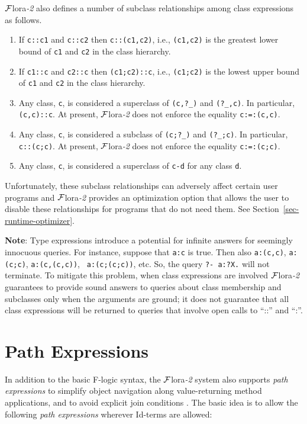 \documentclass[11pt]{article}
\newcommand{\FLORA}{{\mbox{\sc ${\cal F}${lora}\rm\emph{-2}}}\xspace}
\newcommand{\fl}{\mbox{F-logic}\xspace}
\begin{document}
\FLORA also defines a number of subclass relationships among class
expressions as follows.
\begin{enumerate}
\item If {\tt c::c1} and {\tt c::c2} then {\tt c::(c1,c2)}, i.e.,
  {\tt (c1,c2)} is the greatest lower bound of {\tt c1} and {\tt c2} in the
  class hierarchy.
\item If {\tt c1::c} and {\tt c2::c} then {\tt (c1;c2)::c}, i.e.,
  {\tt (c1;c2)} is the lowest upper bound of {\tt c1} and {\tt c2} in the
  class hierarchy. 
\item Any class, {\tt c}, is considered a superclass of {\tt (c,?\_)} and
  {\tt (?\_,c)}. In particular, {\tt (c,c)::c}. At present, \FLORA does not
  enforce the equality {\tt c:=:(c,c)}.      
\item Any class, {\tt c}, is considered a subclass of {\tt (c;?\_)} and
  {\tt (?\_;c)}. In particular, {\tt c::(c;c)}. At present, \FLORA does not
  enforce the equality {\tt c:=:(c;c)}.      
\item Any class, {\tt c}, is considered a superclass of {\tt c-d} for any
  class {\tt d}.   
\end{enumerate}
Unfortunately, these subclass relationships can adversely affect certain user
programs and \FLORA provides an optimization option that allows the user to
disable these relationships for programs that do not need them. See
Section~\ref{sec-runtime-optimizer}.

{\bf Note}: Type expressions introduce a potential for infinite answers
for seemingly innocuous queries. For instance, suppose that {\tt a:c} is
true. Then also {\tt a:(c,c)}, {\tt a:(c;c)}, {\tt a:(c,(c,c))}, {\tt
  a:(c;(c;c))}, etc. So, the query {\tt ?- a:?X.} will not terminate.
To mitigate this problem, when class expressions are involved
\FLORA guarantees to provide sound answers to queries about class
membership and subclasses only when the arguments are ground; it does
not guarantee that all class expressions will be returned to 
queries that involve open calls to ``::'' and ``:''.



\section{Path Expressions}\label{sec-pathexpr}


 
In addition to the basic \fl syntax, the \FLORA  system also supports
\emph{path expressions} to simplify object navigation along
value-returning method applications, and to avoid
explicit join conditions \cite{frohn-lausen-uphoff-VLDB-94}.  The
basic idea is to allow the following \emph{path expressions} wherever
Id-terms are allowed:
\end{document}
